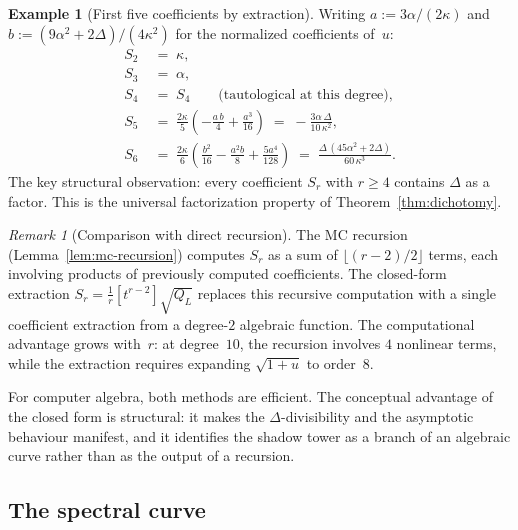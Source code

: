 \documentclass[11pt,reqno]{amsart}
\theoremstyle{definition}
\newtheorem{example}[theorem]{Example}
\theoremstyle{remark}
\newtheorem{remark}[theorem]{Remark}
\numberwithin{equation}{section}
\begin{document}
\begin{example}[First five coefficients by
extraction]\label{ex:first-five}
Writing $a := 3\alpha/(2\kappa)$ and
$b := (9\alpha^2 + 2\Delta)/(4\kappa^2)$ for the
normalized coefficients of~$u$:
\begin{align}
 S_2 &\;=\; \kappa, \label{eq:S2-extract} \\
 S_3 &\;=\; \alpha, \label{eq:S3-extract} \\
 S_4 &\;=\; S_4 \qquad\text{(tautological at this
 degree)}, \label{eq:S4-extract} \\
 S_5 &\;=\;
 \frac{2\kappa}{5}\left(-\frac{a\,b}{4}
 + \frac{a^3}{16}\right)
 \;=\;
 -\frac{3\alpha\,\Delta}{10\,\kappa^2},
 \label{eq:S5-extract} \\
 S_6 &\;=\;
 \frac{2\kappa}{6}\left(\frac{b^2}{16}
 - \frac{a^2 b}{8}
 + \frac{5 a^4}{128}\right)
 \;=\;
 \frac{\Delta\,(45\alpha^2 + 2\Delta)}{60\,\kappa^3}.
 \label{eq:S6-extract}
\end{align}
The key structural observation: every coefficient $S_r$
with $r \ge 4$ contains $\Delta$ as a factor. This is the
universal factorization property of
Theorem~\ref{thm:dichotomy}.
\end{example}

\begin{remark}[Comparison with direct
recursion]\label{rem:direct-vs-closed}
The MC recursion (Lemma~\ref{lem:mc-recursion}) computes
$S_r$ as a sum of $\lfloor(r-2)/2\rfloor$ terms, each
involving products of previously computed coefficients.
The closed-form extraction
$S_r = \frac{1}{r}[t^{r-2}]\sqrt{Q_L}$ replaces this
recursive computation with a single coefficient extraction
from a degree-$2$ algebraic function. The computational
advantage grows with~$r$: at degree~$10$, the recursion
involves $4$ nonlinear terms, while the extraction requires
expanding $\sqrt{1 + u}$ to order~$8$.

For computer algebra, both methods are efficient. The
conceptual advantage of the closed form is structural: it
makes the $\Delta$-divisibility and the asymptotic behaviour
manifest, and it identifies the shadow tower as a branch of
an algebraic curve rather than as the output of a recursion.
\end{remark}


\subsection{The spectral curve}\label{subsec:spectral-curve}
\end{document}
